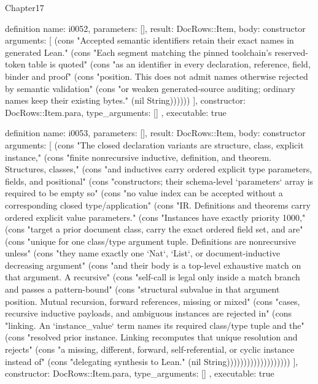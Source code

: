 \begin{lexlean}{Chapter17}
\begin{semanticmodule}
definition{
  name: i0052,
  parameters: [],
  result: DocRows::Item,
  body: constructor{
    arguments: [
      (cons "Accepted semantic identifiers retain their exact names in generated Lean." (cons "Each segment matching the pinned toolchain's reserved-token table is quoted" (cons "as an identifier in every declaration, reference, field, binder and proof" (cons "position. This does not admit names otherwise rejected by semantic validation" (cons "or weaken generated-source auditing; ordinary names keep their existing bytes." (nil String))))))
    ],
    constructor: DocRows::Item.para,
    type_arguments: []
  },
  executable: true
}

definition{
  name: i0053,
  parameters: [],
  result: DocRows::Item,
  body: constructor{
    arguments: [
      (cons "The closed declaration variants are structure, class, explicit instance," (cons "finite nonrecursive inductive, definition, and theorem. Structures, classes," (cons "and inductives carry ordered explicit type parameters, fields, and positional" (cons "constructors; their schema-level `parameters` array is required to be empty so" (cons "no value index can be accepted without a corresponding closed type/application" (cons "IR. Definitions and theorems carry ordered explicit value parameters." (cons "Instances have exactly priority 1000," (cons "target a prior document class, carry the exact ordered field set, and are" (cons "unique for one class/type argument tuple. Definitions are nonrecursive unless" (cons "they name exactly one `Nat`, `List`, or document-inductive decreasing argument" (cons "and their body is a top-level exhaustive match on that argument. A recursive" (cons "self-call is legal only inside a match branch and passes a pattern-bound" (cons "structural subvalue in that argument position. Mutual recursion, forward references, missing or mixed" (cons "cases, recursive inductive payloads, and ambiguous instances are rejected in" (cons "linking. An `instance_value` term names its required class/type tuple and the" (cons "resolved prior instance. Linking recomputes that unique resolution and rejects" (cons "a missing, different, forward, self-referential, or cyclic instance instead of" (cons "delegating synthesis to Lean." (nil String)))))))))))))))))))
    ],
    constructor: DocRows::Item.para,
    type_arguments: []
  },
  executable: true
}


\end{semanticmodule}
\end{lexlean}

